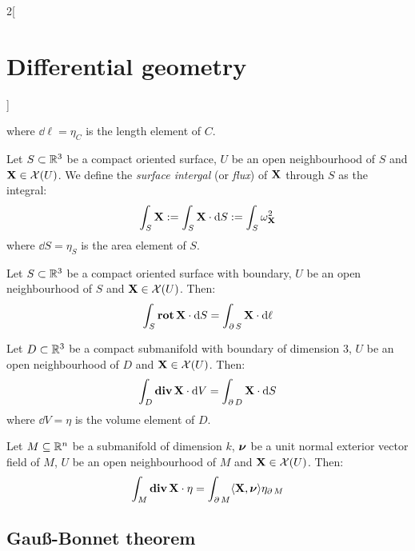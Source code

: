 \documentclass[../../../main_math.tex]{subfiles}
\begin{document}
\begin{multicols}{2}[\section{Differential geometry}]
\begin{definition}
    where $\dd{\ell}=\eta_C$ is the length element of $C$.
  \end{definition}
  \begin{definition}
    Let $S\subset\mathbb{R}^3$ be a compact oriented surface, $U$ be an open neighbourhood of $S$ and $\boldsymbol{\mathrm{X}}\in\mathcal{X}(U)$. We define the \emph{surface intergal} (or \emph{flux}) of $\boldsymbol{\mathrm{X}}$ through $S$ as the integral: $$\int_S\boldsymbol{\mathrm{X}}:=\int_S\boldsymbol{\mathrm{X}}\cdot\dd{S}:=\int_S\omega_{\boldsymbol{\mathrm{X}}}^2$$
    where $\dd{S}=\eta_S$ is the area element of $S$.
  \end{definition}
  \begin{theorem}
    Let $S\subset\mathbb{R}^3$ be a compact oriented surface with boundary, $U$ be an open neighbourhood of $S$ and $\boldsymbol{\mathrm{X}}\in\mathcal{X}(U)$. Then: $$\int_S\operatorname{\boldsymbol{\mathrm{rot}}}{\boldsymbol{\mathrm{X}}}\cdot\dd{S}=\int_{\operatorname{\partial}{S}}\boldsymbol{\mathrm{X}}\cdot\dd{\ell}$$
  \end{theorem}
  \begin{theorem}
    Let $D\subset\mathbb{R}^3$ be a compact submanifold with boundary of dimension 3, $U$ be an open neighbourhood of $D$ and $\boldsymbol{\mathrm{X}}\in\mathcal{X}(U)$. Then: $$\int_D\operatorname{\boldsymbol{\mathrm{div}}}{\boldsymbol{\mathrm{X}}}\cdot\dd{V}=\int_{\operatorname{\partial}{D}}\boldsymbol{\mathrm{X}}\cdot\dd{S}$$
    where $\dd{V}=\eta$ is the volume element of $D$.
  \end{theorem}
  \begin{theorem}
    Let $M\subseteq\mathbb{R}^n$ be a submanifold of dimension $k$, $\boldsymbol{\mathrm{\nu}}$ be a unit normal exterior vector field of $M$, $U$ be an open neighbourhood of $M$ and $\boldsymbol{\mathrm{X}}\in\mathcal{X}(U)$. Then: $$\int_M\operatorname{\boldsymbol{\mathrm{div}}}{\boldsymbol{\mathrm{X}}}\cdot\eta=\int_{\operatorname{\partial}{M}}\langle\boldsymbol{\mathrm{X}},\boldsymbol{\mathrm{\nu}}\rangle\eta_{\operatorname{\partial}{M}}$$
  \end{theorem}
  \subsection{Gau\ss-Bonnet theorem}

\end{multicols}
\end{document}
